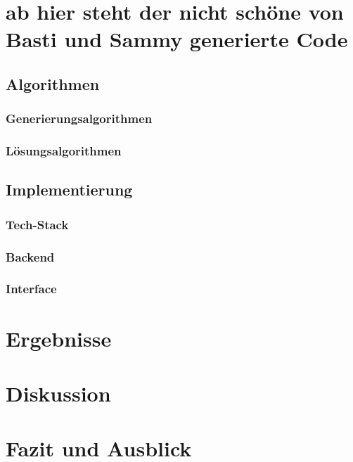 \documentclass[12pt,a4paper]{article}
\begin{document}




\section{ab hier steht der nicht schöne von Basti und Sammy generierte Code}
\subsection{Algorithmen}
\subsubsection{Generierungsalgorithmen}


\subsubsection{Lösungsalgorithmen}


\subsection{Implementierung}


\subsubsection{Tech-Stack}


\subsubsection{Backend}
\subsubsection{Interface}

\section{Ergebnisse}

\section{Diskussion}

\section{Fazit und Ausblick}



\end{document}
